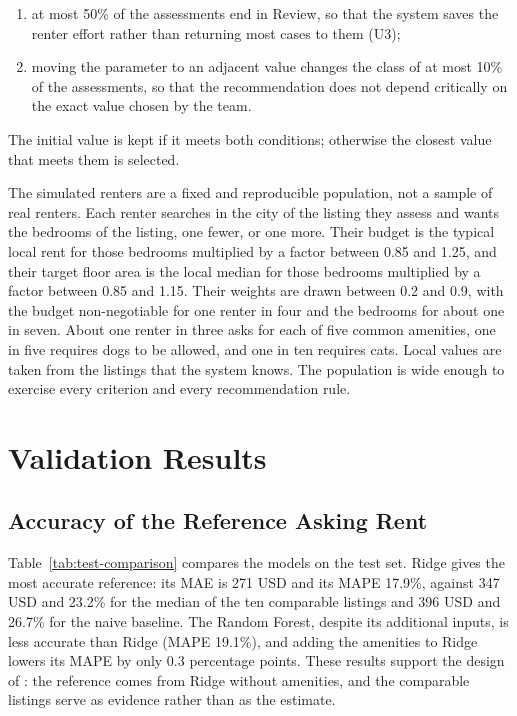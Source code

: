 \documentclass[12pt,a4paper]{report}
\begin{document}
\begin{enumerate}[leftmargin=*]
  \item at most 50\% of the assessments end in Review, so that the system
  saves the renter effort rather than returning most cases to them (U3);
  \item moving the parameter to an adjacent value changes the class of at
  most 10\% of the assessments, so that the recommendation does not depend
  critically on the exact value chosen by the team.
\end{enumerate}

The initial value is kept if it meets both conditions; otherwise the closest
value that meets them is selected.

The simulated renters are a fixed and reproducible population, not a sample
of real renters. Each renter searches in the city of the listing they assess
and wants the bedrooms of the listing, one fewer, or one more. Their budget
is the typical local rent for those bedrooms multiplied by a factor between
0.85 and 1.25, and their target floor area is the local median for those
bedrooms multiplied by a factor between 0.85 and 1.15. Their weights are drawn
between 0.2 and 0.9, with the budget non-negotiable for one renter in four
and the bedrooms for about one in seven. About one renter in three asks for
each of five common amenities, one in five requires dogs to be allowed, and
one in ten requires cats. Local values are taken from the listings that the
system knows. The population is wide enough to exercise every criterion and
every recommendation rule.

\section{Validation Results}
\label{sec:validation-results}

\subsection{Accuracy of the Reference Asking Rent}

Table~\ref{tab:test-comparison} compares the models on the test set. Ridge
gives the most accurate reference: its MAE is 271 USD and its MAPE 17.9\%,
against 347 USD and 23.2\% for the median of the ten comparable listings and
396 USD and 26.7\% for the naive baseline. The Random Forest, despite its
additional inputs, is less accurate than Ridge (MAPE 19.1\%), and adding the
amenities to Ridge lowers its MAPE by only 0.3 percentage points. These
results support the design of : the reference comes
from Ridge without amenities, and the comparable listings serve as evidence
rather than as the estimate.
\end{document}
